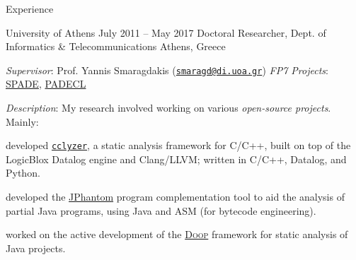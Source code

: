 \documentclass{resume}
\begin{document}
\begin{rSection}{Experience}
\begin{rSubsection}
  {University of Athens}
  {July 2011 -- May 2017}
  {Doctoral Researcher, Dept. of Informatics \& Telecommunications}
  {Athens, Greece}
\item \emph{Supervisor}: Prof. Yannis Smaragdakis
  (\href{mailto:smaragd@di.uoa.gr}{\nolinkurl{smaragd@di.uoa.gr}})
  \hfill{%
  \emph{FP7 Projects}:
  \href{http://cordis.europa.eu/project/rcn/104361_en.html}{SPADE},
  \href{http://cordis.europa.eu/project/rcn/95729_en.html}{PADECL}}
\item \emph{Description}: My research involved working on various
  \emph{open-source projects}. Mainly: \vspace{-0.5em}
  \begin{compactitem}[--]
  \item developed
    \href{https://github.com/plast-lab/cclyzer}{\texttt{cclyzer}}, a
    static analysis framework for C/C++, built on top of the LogicBlox
    Datalog engine and Clang/LLVM; written in C/C++, Datalog, and
    Python.
  \item developed the
    \href{https://github.com/gbalats/jphantom}{JPhantom} program
    complementation tool to aid the analysis of partial Java programs,
    using Java and ASM (for bytecode engineering).
  \item worked on the active development of the
    \href{https://bitbucket.org/yanniss/doop}{\textsc{Doop}}
    framework for static analysis of Java projects.
  \end{compactitem}
\end{rSubsection}



\end{rSection}
\end{document}
